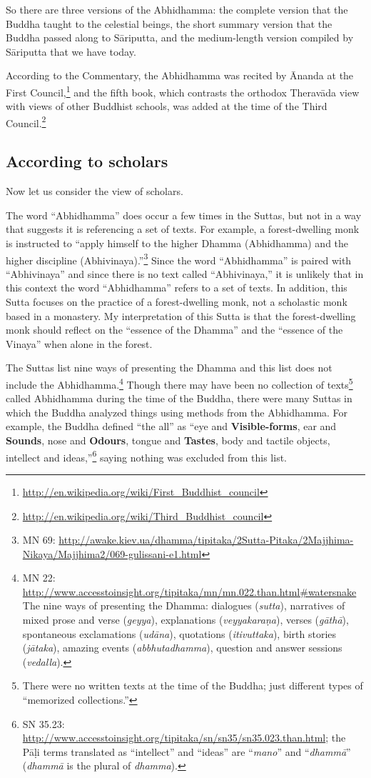 So there are three versions of the Abhidhamma: the complete version that the Buddha taught to the celestial beings, the short summary version that the Buddha passed along to Sāriputta, and the medium-length version compiled by Sāriputta that we have today. 

According to the Commentary, the Abhidhamma was recited by Ānanda at the First Council,\footnote{\url{http://en.wikipedia.org/wiki/First_Buddhist_council}} and the fifth book, which contrasts the orthodox Theravāda view with views of other Buddhist schools, was added at the time of the Third Council.\footnote{\url{http://en.wikipedia.org/wiki/Third_Buddhist_council}}

\subsection*{According to scholars}

Now let us consider the view of scholars. 

The word “Abhidhamma” does occur a few times in the Suttas, but not in a way that suggests it is referencing a set of texts. For example, a forest-dwelling monk is instructed to “apply himself to the higher Dhamma (Abhidhamma) and the higher discipline (Abhivinaya).”\footnote{MN 69: \url{http://awake.kiev.ua/dhamma/tipitaka/2Sutta-Pitaka/2Majjhima-Nikaya/Majjhima2/069-gulissani-e1.html}} Since the word “Abhidhamma” is paired with “Abhivinaya” and since there is no text called “Abhivinaya,” it is unlikely that in this context the word “Abhidhamma” refers to a set of texts. In addition, this Sutta focuses on the practice of a forest-dwelling monk, not a scholastic monk based in a monastery. My interpretation of this Sutta is that the forest-dwelling monk should reflect on the “essence of the Dhamma” and the “essence of the Vinaya” when alone in the forest.

The Suttas list nine ways of presenting the Dhamma and this list does not include the Abhidhamma.\footnote{MN 22: \url{http://www.accesstoinsight.org/tipitaka/mn/mn.022.than.html\#watersnake}\\The nine ways of presenting the Dhamma: dialogues (\textit{sutta}), narratives of mixed prose and verse (\textit{geyya}), explanations (\textit{veyyakaraṇa}), verses (\textit{gāthā}), spontaneous exclamations (\textit{udāna}), quotations (\textit{itivuttaka}), birth stories (\textit{jātaka}), amazing events (\textit{abbhutadhamma}), question and answer sessions (\textit{vedalla}).} Though there may have been no collection of texts\footnote{There were no written texts at the time of the Buddha; just different types of “memorized collections.”} called Abhidhamma during the time of the Buddha, there were many Suttas in which the Buddha analyzed things using methods from the Abhidhamma. For example, the Buddha defined “the all” as “eye and \textbf{Visible-forms}, ear and \textbf{Sounds}, nose and \textbf{Odours}, tongue and \textbf{Tastes}, body and tactile objects, intellect and ideas,”\footnote{SN 35.23: \url{http://www.accesstoinsight.org/tipitaka/sn/sn35/sn35.023.than.html}; the Pāḷi terms translated as “intellect” and “ideas” are “\textit{mano}” and “\textit{dhammā}” (\textit{dhammā} is the plural of \textit{dhamma}).} saying nothing was excluded from this list.

